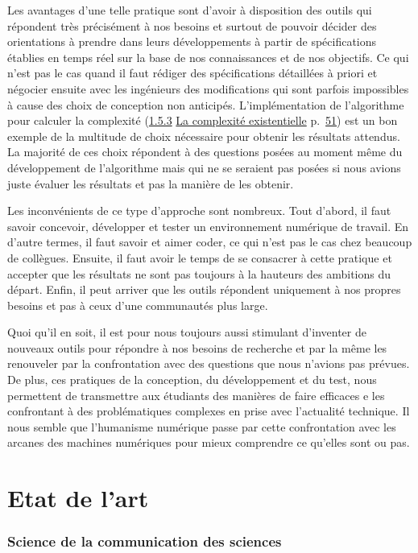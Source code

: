 \documentclass[
  a4paper,
  DIV=11,
  numbers=noendperiod]{scrreprt}
\begin{document}
Les avantages d'une telle pratique sont d'avoir à disposition des outils
qui répondent très précisément à nos besoins et surtout de pouvoir
décider des orientations à prendre dans leurs développements à partir de
spécifications établies en temps réel sur la base de nos connaissances
et de nos objectifs. Ce qui n'est pas le cas quand il faut rédiger des
spécifications détaillées à priori et négocier ensuite avec les
ingénieurs des modifications qui sont parfois impossibles à cause des
choix de conception non anticipés. L'implémentation de l'algorithme pour
calculer la complexité (\hyperref[anchor-19]{1.5.3}
\hyperref[anchor-19]{La complexité existentielle}
p.~\hyperref[anchor-19]{51}) est un bon exemple de la multitude de choix
nécessaire pour obtenir les résultats attendus. La majorité de ces choix
répondent à des questions posées au moment même du développement de
l'algorithme mais qui ne se seraient pas posées si nous avions juste
évaluer les résultats et pas la manière de les obtenir.

Les inconvénients de ce type d'approche sont nombreux. Tout d'abord, il
faut savoir concevoir, développer et tester un environnement numérique
de travail. En d'autre termes, il faut savoir et aimer coder, ce qui
n'est pas le cas chez beaucoup de collègues. Ensuite, il faut avoir le
temps de se consacrer à cette pratique et accepter que les résultats ne
sont pas toujours à la hauteurs des ambitions du départ. Enfin, il peut
arriver que les outils répondent uniquement à nos propres besoins et pas
à ceux d'une communautés plus large.

Quoi qu'il en soit, il est pour nous toujours aussi stimulant d'inventer
de nouveaux outils pour répondre à nos besoins de recherche et par la
même les renouveler par la confrontation avec des questions que nous
n'avions pas prévues. De plus, ces pratiques de la conception, du
développement et du test, nous permettent de transmettre aux étudiants
des manières de faire efficaces e les confrontant à des problématiques
complexes en prise avec l'actualité technique. Il nous semble que
l'humanisme numérique passe par cette confrontation avec les arcanes des
machines numériques pour mieux comprendre ce qu'elles sont ou pas.

\chapter{Etat de l'art}\label{sec-etatArtTI}

\subsection{Science de la communication des
sciences}\label{science-de-la-communication-des-sciences}
\end{document}
